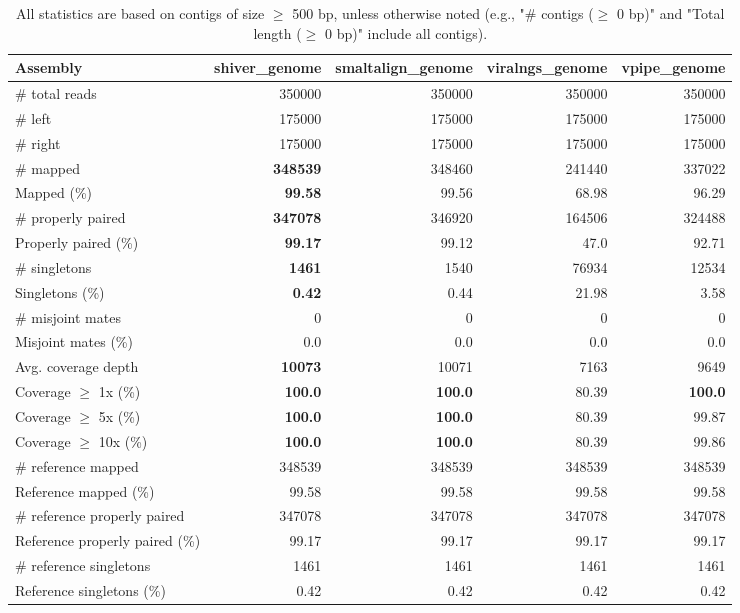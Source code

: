 \documentclass[12pt,a4paper]{article}
\begin{document}
\begin{table}[ht]
\begin{center}
\caption{All statistics are based on contigs of size $\geq$ 500 bp, unless otherwise noted (e.g., "\# contigs ($\geq$ 0 bp)" and "Total length ($\geq$ 0 bp)" include all contigs).}
\begin{tabular}{|l*{4}{|r}|}
\hline
Assembly & shiver\_genome & smaltalign\_genome & viralngs\_genome & vpipe\_genome \\ \hline
\# total reads & 350000 & 350000 & 350000 & 350000 \\ \hline
\# left & 175000 & 175000 & 175000 & 175000 \\ \hline
\# right & 175000 & 175000 & 175000 & 175000 \\ \hline
\# mapped & {\bf 348539} & 348460 & 241440 & 337022 \\ \hline
Mapped (\%) & {\bf 99.58} & 99.56 & 68.98 & 96.29 \\ \hline
\# properly paired & {\bf 347078} & 346920 & 164506 & 324488 \\ \hline
Properly paired (\%) & {\bf 99.17} & 99.12 & 47.0 & 92.71 \\ \hline
\# singletons & {\bf 1461} & 1540 & 76934 & 12534 \\ \hline
Singletons (\%) & {\bf 0.42} & 0.44 & 21.98 & 3.58 \\ \hline
\# misjoint mates & 0 & 0 & 0 & 0 \\ \hline
Misjoint mates (\%) & 0.0 & 0.0 & 0.0 & 0.0 \\ \hline
Avg. coverage depth & {\bf 10073} & 10071 & 7163 & 9649 \\ \hline
Coverage $\geq$ 1x (\%) & {\bf 100.0} & {\bf 100.0} & 80.39 & {\bf 100.0} \\ \hline
Coverage $\geq$ 5x (\%) & {\bf 100.0} & {\bf 100.0} & 80.39 & 99.87 \\ \hline
Coverage $\geq$ 10x (\%) & {\bf 100.0} & {\bf 100.0} & 80.39 & 99.86 \\ \hline
\# reference mapped & 348539 & 348539 & 348539 & 348539 \\ \hline
Reference mapped (\%) & 99.58 & 99.58 & 99.58 & 99.58 \\ \hline
\# reference properly paired & 347078 & 347078 & 347078 & 347078 \\ \hline
Reference properly paired (\%) & 99.17 & 99.17 & 99.17 & 99.17 \\ \hline
\# reference singletons & 1461 & 1461 & 1461 & 1461 \\ \hline
Reference singletons (\%) & 0.42 & 0.42 & 0.42 & 0.42 \\ \hline

\end{tabular}
\end{center}
\end{table}
\end{document}
